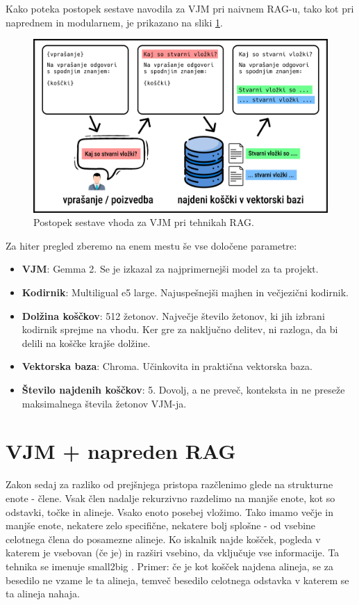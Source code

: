 \documentclass[a4paper,12pt,openright]{book}
\begin{document}
Kako poteka postopek sestave navodila za VJM pri naivnem RAG-u, tako kot pri naprednem in modularnem, je prikazano na sliki \ref{template}.

\begin{figure}[htbp]
    \centering
    \includegraphics[width=\textwidth]{template.png}
    \caption{Postopek sestave vhoda za VJM pri tehnikah RAG.}
    \label{template}
\end{figure}

Za hiter pregled zberemo na enem mestu še vse določene parametre:

\begin{itemize}
    \item \textbf{VJM}: Gemma 2. Se je izkazal za najprimernejši model za ta projekt.
    \item \textbf{Kodirnik}: Multiligual e5 large. Najuspešnejši majhen in večjezični kodirnik.
    \item \textbf{Dolžina koščkov}: 512 žetonov. Največje število žetonov, ki jih izbrani kodirnik sprejme na vhodu. Ker gre za naključno delitev, ni razloga, da bi delili na koščke krajše dolžine.
    \item \textbf{Vektorska baza}: Chroma. Učinkovita in praktična vektorska baza.
    \item \textbf{Število najdenih koščkov}: 5. Dovolj, a ne preveč, konteksta in ne preseže maksimalnega števila žetonov VJM-ja.
\end{itemize}

\section{VJM + napreden RAG}

Zakon sedaj za razliko od prejšnjega pristopa razčlenimo glede na strukturne enote - člene. Vsak člen nadalje rekurzivno razdelimo na manjše enote, kot so odstavki, točke in alineje. Vsako enoto posebej vložimo. Tako imamo večje in manjše enote, nekatere zelo specifične, nekatere bolj splošne - od vsebine celotnega člena do posamezne alineje. Ko iskalnik najde košček, pogleda v katerem je vsebovan (če je) in razširi vsebino, da vključuje vse informacije. Ta tehnika se imenuje small2big \cite{small2big}. Primer: če je kot košček najdena alineja, se za besedilo ne vzame le ta alineja, temveč besedilo celotnega odstavka v katerem se ta alineja nahaja.
\end{document}
